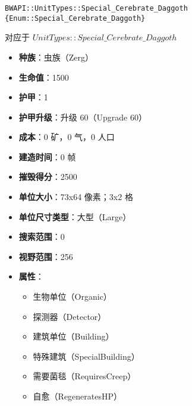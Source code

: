 \begin{tcolorbox}[colback=white, colframe=black!60!white, title=Special\_Cerebrate\_Daggoth(), arc=0mm]
    \begin{verbatim}
BWAPI::UnitTypes::Special_Cerebrate_Daggoth {Enum::Special_Cerebrate_Daggoth}
    \end{verbatim}
    对应于  $UnitTypes::Special\_Cerebrate\_Daggoth$ 
    \begin{itemize}
        \item \textbf{种族}：虫族（Zerg）
        \item \textbf{生命值}：1500
        \item \textbf{护甲}：1
        \item \textbf{护甲升级}：升级 60（Upgrade 60）
        \item \textbf{成本}：0 矿，0 气，0 人口
        \item \textbf{建造时间}：0 帧
        \item \textbf{摧毁得分}：2500
        \item \textbf{单位大小}：73x64 像素；3x2 格
        \item \textbf{单位尺寸类型}：大型（Large）
        \item \textbf{搜索范围}：0
        \item \textbf{视野范围}：256
        \item \textbf{属性}：
            \begin{itemize}
                \item 生物单位（Organic）
                \item 探测器（Detector）
                \item 建筑单位（Building）
                \item 特殊建筑（SpecialBuilding）
                \item 需要菌毯（RequiresCreep）
                \item 自愈（RegeneratesHP）
            \end{itemize}
    \end{itemize}
\end{tcolorbox}

